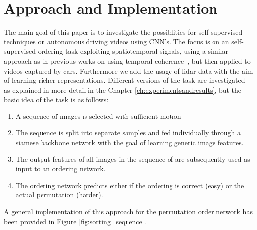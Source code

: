 %
\newpage
\chapter{Approach and Implementation}
\label{ch:implementationdetails}
The main goal of this paper is to investigate the possiblities for self-supervised techniques on autonomous driving videos using CNN's. The focus is on an self-supervised ordering task exploiting spatiotemporal signals, using a similar approach as in previous works on using temporal coherence~\cite{misra2016,lee2017}, but then applied to videos captured by cars. Furthermore we add the usage of lidar data with the aim of learning richer representations. Different versions of the task are investigated as explained in more detail in the  Chapter \ref{ch:experimentsandresults}, but the basic idea of the task is as follows:
\begin{enumerate}    
\item A sequence of images is selected with sufficient motion
\item The sequence is split into separate samples and fed individually through a siamese backbone network with the goal of learning generic image features.
\item The output features of all images in the sequence of are subsequently used as input to an ordering network.
\item The ordering network predicts either if the ordering is correct (easy)\cite{misra2016} or the actual permutation (harder)\cite{lee2017}.
\end{enumerate}
A general implementation of this approach for the permutation order network has been provided in Figure \ref{fig:sorting_sequence}.

